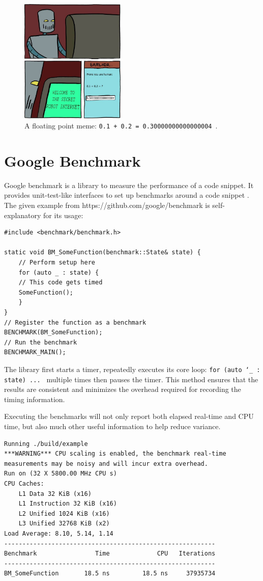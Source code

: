 \documentclass[logo,bsc,singlespacing,parskip]{infthesis}
\begin{document}


\begin{figure}[H]
\begin{center}
    \includegraphics[width=50mm,scale=0.1]{image/0.3004.jpg}
    \caption{A floating point meme: \texttt{0.1 + 0.2 =
    0.30000000000000004}~\cite{meme}.}
    \label{meme}
\end{center}
\end{figure}

\section{Google Benchmark}
Google benchmark is a library to measure the performance of a code snippet. It
provides unit-test-like interfaces to set up benchmarks around a code snippet
\cite{googlebench}. The given example from https://github.com/google/benchmark
is self-explanatory for its usage: 

\begin{verbatim}
#include <benchmark/benchmark.h>

static void BM_SomeFunction(benchmark::State& state) {
    // Perform setup here
    for (auto _ : state) {
    // This code gets timed
    SomeFunction();
    }
}
// Register the function as a benchmark
BENCHMARK(BM_SomeFunction);
// Run the benchmark
BENCHMARK_MAIN();
\end{verbatim}

The library first starts a timer, repeatedly executes its core loop: \linebreak
\texttt{for (auto \char`_ : state) ... } 
multiple times then pauses the timer. This method
ensures that the results are consistent and minimizes the overhead required for
recording the timing information. 

Executing the benchmarks will not only report both elapsed real-time and CPU
time, but also much other useful information to help reduce variance. 
\begin{verbatim}
Running ./build/example
***WARNING*** CPU scaling is enabled, the benchmark real-time 
measurements may be noisy and will incur extra overhead.
Run on (32 X 5800.00 MHz CPU s)
CPU Caches:
    L1 Data 32 KiB (x16)
    L1 Instruction 32 KiB (x16)
    L2 Unified 1024 KiB (x16)
    L3 Unified 32768 KiB (x2)
Load Average: 8.10, 5.14, 1.14
----------------------------------------------------------
Benchmark                Time             CPU   Iterations
----------------------------------------------------------
BM_SomeFunction       18.5 ns         18.5 ns     37935734
\end{verbatim}
\end{document}
